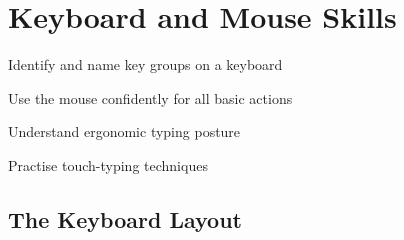 
\chapter{Keyboard and Mouse Skills}
\label{ch:keyboard-mouse}

\begin{objectives}
  \item Identify and name key groups on a keyboard
  \item Use the mouse confidently for all basic actions
  \item Understand ergonomic typing posture
  \item Practise touch-typing techniques
\end{objectives}


\section{The Keyboard Layout}
\label{sec:keyboard-layout}

